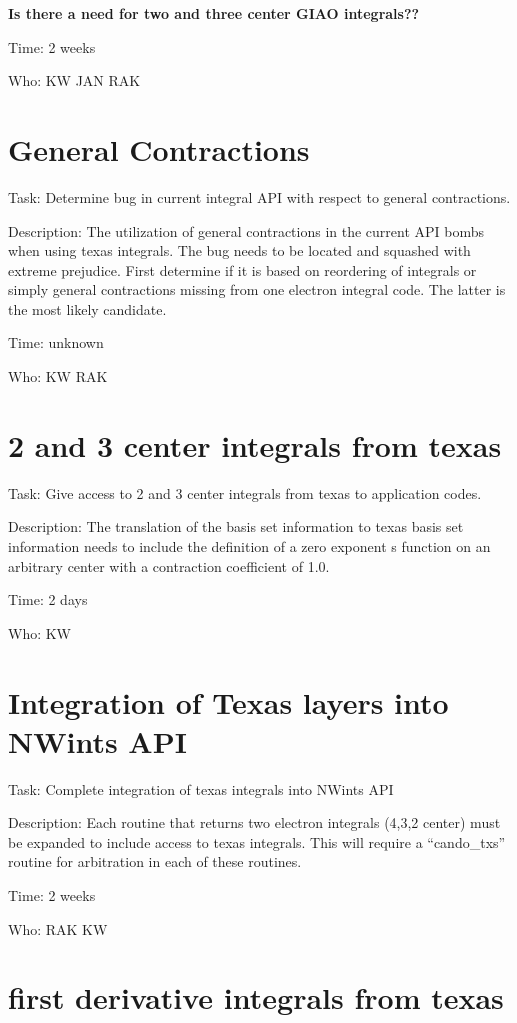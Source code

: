 {\bf Is there a need for two and three center GIAO integrals??}

Time: 2 weeks

Who: KW JAN RAK


\section{General Contractions}
Task: Determine bug in current integral API with respect to general
contractions. 

Description:  The utilization of general contractions in the current
API bombs when using texas integrals.  The bug needs to be located and
squashed with extreme prejudice.  First determine if it is based on
reordering of integrals or simply general contractions missing from
one electron integral code.  The latter is the most likely candidate.  

Time: unknown

Who: KW RAK


\section{2 and 3 center integrals from texas}

Task: Give access to 2 and 3 center integrals from texas to
application codes. 

Description:  The translation of the basis set information to texas
basis set information needs to include the definition of a zero
exponent s function on an arbitrary center with a contraction
coefficient of 1.0. 

Time: 2 days

Who: KW


\section{Integration of Texas layers into NWints API}

Task: Complete integration of texas integrals into NWints API

Description: Each routine that returns two electron integrals (4,3,2
center) must be expanded to include access to texas integrals.  This
will require a ``cando\_txs'' routine for arbitration in each of these
routines.

Time: 2 weeks

Who: RAK KW


\section{first derivative integrals from texas}

